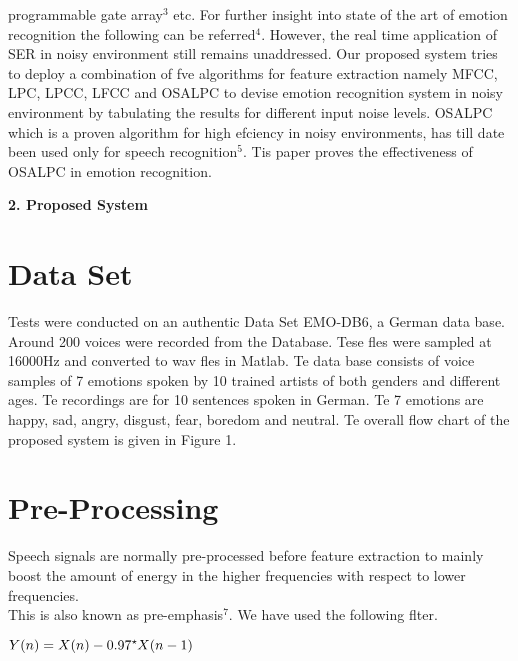 \documentclass[10pt,a4paper,twoside]{article}
\begin{document}
\begin{multicols*}{2}
programmable gate array$^3$ etc. For further insight into
state of the art of emotion recognition the following
can be referred$^4$. However, the real time application of
SER in noisy environment still remains unaddressed.
Our proposed system tries to deploy a combination of
fve algorithms for feature extraction namely MFCC,
LPC, LPCC, LFCC and OSALPC to devise emotion
recognition system in noisy environment by tabulating the results for different input noise levels. OSALPC
which is a proven algorithm for high efciency in noisy
environments, has till date been used only for speech
recognition$^5$. Tis paper proves the effectiveness of
OSALPC in emotion recognition.
\bigskip

{\Large  \color{tieude} \rmfamily \textbf{2. Proposed System }}
\smallskip

\section*{\color{tieude} {\fontsize{11pt}{13pt} Data Set}}

Tests were conducted on an authentic Data Set
EMO-DB6, a German data base. Around 200 voices were
recorded from the Database. Tese fles were sampled
at 16000Hz and converted to wav fles in Matlab. Te
data base consists of voice samples of 7 emotions spoken
by 10 trained artists of both genders and different ages. Te recordings are for 10 sentences spoken in German.
Te 7 emotions are happy, sad, angry, disgust, fear, boredom and neutral. Te overall flow chart of the proposed
system is given in Figure 1.
\smallskip
\section*{\color{tieude} {\fontsize{11pt}{13pt} Pre-Processing}}

Speech signals are normally pre-processed before feature extraction to mainly boost the amount of energy
in the higher frequencies with respect to lower frequencies.\\
This is also known as pre-emphasis$^7$. We have used the
following flter.
\begin{center}
$
Y(n)=X(n)-0.97\text{\raisebox{0.9ex}{\mbox{\scriptsize$\star$}}}X(n-1)
$
\end{center}

\end{multicols*}
\end{document}
